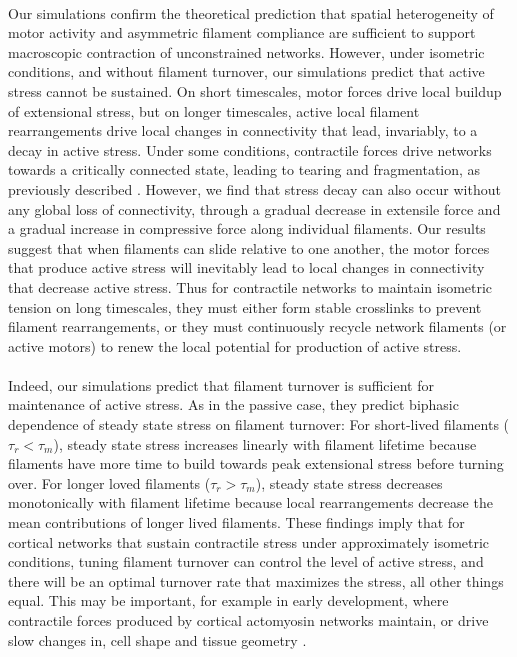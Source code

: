 \documentclass[10pt,letterpaper]{article}
\begin{document}
\paragraph{} Our simulations confirm the theoretical prediction \cite{1367-2630-14-3-033037,rheo_2D1,rheo_active} that spatial heterogeneity of motor activity and asymmetric filament compliance are sufficient to support macroscopic contraction of unconstrained networks. However, under isometric conditions, and without filament turnover, our simulations predict that active stress cannot be sustained. On short timescales, motor forces drive local buildup of extensional stress, but on longer timescales, active local filament rearrangements drive local changes in connectivity that lead, invariably, to a decay in active stress.  Under some conditions, contractile forces drive networks towards a critically connected state, leading to tearing and fragmentation, as previously described \cite{Alvarado:2013aa, Mak:2016aa}. However, we find that stress decay can also occur without any global loss of connectivity, through a gradual decrease in extensile force and a gradual increase in compressive force along individual filaments.   Our results suggest that when filaments can slide relative to one another, the motor forces that produce active stress will inevitably lead to local changes in connectivity that decrease active stress.  Thus for contractile networks to maintain isometric tension on long timescales, they must either form stable crosslinks to prevent filament rearrangements, or they must continuously recycle network filaments (or active motors) to renew the local potential for production of active stress.

\paragraph{} Indeed, our simulations predict that filament turnover is sufficient for maintenance of active stress. As in the passive case, they predict biphasic dependence of steady state stress on filament turnover: For short-lived filaments ($\tau_r < \tau_m$), steady state stress increases linearly with filament lifetime because filaments have more time to build towards peak extensional stress before turning over.  For longer loved filaments ($\tau_r > \tau_m$), steady state stress decreases monotonically with filament lifetime because local rearrangements decrease the mean contributions of longer lived filaments. These findings imply that for cortical networks that sustain contractile stress under approximately isometric conditions, tuning filament turnover can control the level of active stress, and there will be an optimal turnover rate that maximizes the stress, all other things equal.  This may be important, for example in early development, where contractile forces produced by cortical actomyosin networks maintain, or drive slow changes in, cell shape and tissue geometry \cite{Salbreux2012536,Gorfinkiel2011531}.
\end{document}
